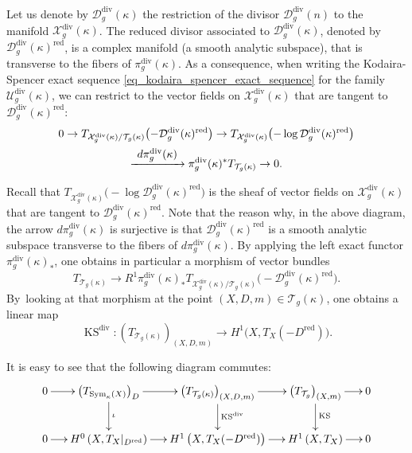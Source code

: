\documentclass[10pt]{amsart}
\newcommand\To[1]{\mathchoice{\xrightarrow{\textstyle\kern4pt#1\kern3pt}}{\stackrel{#1}{\longrightarrow}}{}{}}
\newcommand{\red}{\mathrm{red}}
\DeclareMathOperator{\Div}{div}
\DeclareMathOperator{\KS}{KS}
\DeclareMathOperator{\Sym}{Sym}
\theoremstyle{definition}
\theoremstyle{plain}
\begin{document}
Let us denote by $\mathcal D_g^{\Div}(\kappa)$ the restriction of the divisor $\mathcal D_g^{\Div}(n)$ to the manifold $\mathcal X_g^{\Div}(\kappa)$.
The reduced divisor associated to $\mathcal D_g^{\Div}(\kappa)$, denoted by $\mathcal D_g^{\Div}(\kappa)^{\red}$, is a complex manifold (a smooth analytic subspace), that is transverse to the fibers of $\pi_g^{\Div}(\kappa)$.
As a consequence, when writing the Kodaira-Spencer exact sequence \eqref{eq_kodaira_spencer_exact_sequence} for the family $\mathcal U_g^{\Div}(\kappa)$, we can restrict to the vector fields on $\mathcal X_g^{\Div}(\kappa)$ that are tangent to $\mathcal D_g^{\Div}(\kappa)^{\red}$:\vspace*{-5pt}
\begin{multline*}
0 \to T_{\mathcal X_g^{\Div}(\kappa)/\mathcal T_g(\kappa)}\bigl(-\mathcal D_g^{\Div}(\kappa)^{\red}\bigr) \to T_{\mathcal X_g^{\Div}(\kappa)}\bigl(-\log\mathcal D_g^{\Div}(\kappa)^{\red}\bigr)\\
\To{d\pi_g^{\Div}(\kappa)}\pi_g^{\Div}(\kappa)^*T_{\mathcal T_g(\kappa)} \to 0.
\end{multline*}

Recall that $T_{\mathcal X_g^{\Div}(\kappa)}\bigl(-\log\mathcal D_g^{\Div}(\kappa)^{\red}\bigr)$ is the sheaf of vector fields on $\mathcal X_g^{\Div}(\kappa)$ that are tangent to $\mathcal D_g^{\Div}(\kappa)^{\red}$.
Note that the reason why, in the above diagram, the arrow $d\pi_g^{\Div}(\kappa)$ is surjective is that $\mathcal D_g^{\Div}(\kappa)^{\red}$ is a smooth analytic subspace transverse to the fibers of $d\pi_g^{\Div}(\kappa)$.
By applying the left exact functor $\pi_g^{\Div}(\kappa)_*$, one obtains in particular a morphism of vector bundles\vspace*{-3pt}
\[
T_{\mathcal T_g(\kappa)} \to R^1\pi_g^{\Div}(\kappa)_*T_{\mathcal X_g^{\Div}(\kappa)/\mathcal T_g(\kappa)}\bigl(-\mathcal D_g^{\Div}(\kappa)^{\red}\bigr).
\]
By~looking at that morphism at the point $(X, D, m) \in \mathcal T_g(\kappa)$, one obtains a linear map\vspace*{-3pt}
\begin{equation}\label{eq_kodaira-spencer_2}
\KS^{\Div}:(T_{\mathcal T_g(\kappa)})_{(X, D, m)} \to H^1\bigl(X, T_X(-D^{\red})\bigr).
\end{equation}

It is easy to see that the following diagram commutes:\vspace*{-3pt}
\begin{equation*}
\begin{array}{c}
 \xymatrix@C=.5cm{
 0 \ar[r] &\left(T_{\Sym_{\kappa}(X)}\right)_D \ar[d]^{\iota} \ar[r] & \left(T_{\mathcal T_g(\kappa)}\right)_{(X, D, m)} \ar[d]^{\KS^{\Div}} \ar[r] & \left(T_{\mathcal T_g}\right)_{(X, m)} \ar[d]^{\KS} \ar[r] & 0 \\ 0 \ar[r] & H^0\left(X, T_X|_{D^{\red}}\right) \ar [r] & H^1\left(X, T_X(-D^{\red})\right) \ar[r] & H^1\left(X, T_X\right) \ar[r]& 0
 }
 \end{array}
\end{equation*}
\end{document}
